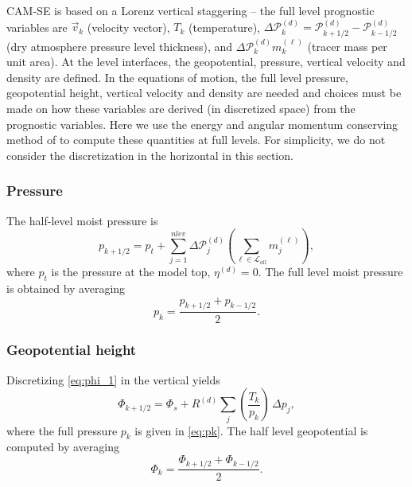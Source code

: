 \documentclass{agujournal}
\begin{document}
{CAM-SE is based on a Lorenz vertical staggering -- the full level prognostic variables are $\vec{v}_k$ (velocity vector), $T_k$ (temperature), $\Delta \mathcal{P}^{(d)}_k=\mathcal{P}^{(d)}_{k+1/2}-\mathcal{P}^{(d)}_{k-1/2}$ (dry atmosphere pressure level thickness), and $\Delta \mathcal{P}^{(d)}_k m_k^{(\ell)}$ (tracer mass per unit area). At the level interfaces, the geopotential, pressure, vertical velocity and density are defined. In the equations of motion, the full level pressure, geopotential height, vertical velocity and density are needed and choices must be made on how these variables are derived (in discretized space) from the prognostic variables. Here we use the energy and angular momentum conserving method of \citet{SB1981MWR} to compute these quantities at full levels. For simplicity, we do not consider the discretization in the horizontal in this section.
\subsubsection{Pressure}\label{sec:pk}
The half-level moist pressure is
\begin{equation}
p_{k+1/2}=p_t+\sum_{j=1}^{nlev}\Delta \mathcal{P}^{(d)}_j \left(\sum_{\ell \in \mathcal{L}_{all}} m_j^{(\ell)}\right),\label{eq:halfpfull}
\end{equation}
where $p_t$ is the pressure at the model top, $\eta^{(d)}=0$.
The full level moist pressure is obtained by averaging \citep{SB1981MWR}
\begin{equation}
p_k=\frac{p_{k+1/2}+p_{k-1/2}}{2}.\label{eq:pk}
\end{equation}
\subsubsection{Geopotential height}
Discretizing \eqref{eq:phi_1} in the vertical yields
\begin{equation}
\Phi_{k+1/2}=\Phi_s+R^{(d)}\sum_j \left( \frac{T_k}{p_k}\right)\, \Delta p_j,
\end{equation}
where the full pressure $p_k$ is given in \eqref{eq:pk}. The half level geopotential is computed by averaging
\begin{equation}
\Phi_k=\frac{\Phi_{k+1/2}+\Phi_{k-1/2}}{2}.
\end{equation}
}
\end{document}
